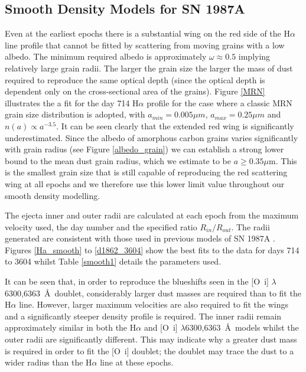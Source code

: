 \documentclass[useAMS,usenatbib,usegraphicx]{mnras}
\begin{document}
\subsection{Smooth Density Models for SN 1987A}
\label{smooth_models}

Even at the earliest epochs there is a substantial wing on the red side of 
the H$\alpha$ line profile that cannot be fitted by scattering from moving grains with a low albedo.  The 
minimum required albedo is approximately $\omega \approx 0.5$ implying relatively large grain radii.  The larger 
the grain size the larger the mass of dust required to reproduce the same 
optical depth (since the optical depth is dependent only on the 
cross-sectional area of the grains).  Figure \ref{MRN} illustrates the 
a fit for the day 714 H$\alpha$ profile for the case where a classic MRN \citep{Mathis1977} grain size 
distribution is adopted, with $a_{min}=0.005 \mu m$, $a_{max}=0.25 \mu m$ 
and $n(a) \propto a^{-3.5}$.  It can be seen clearly that the extended red wing is 
significantly underestimated.  Since the albedo of  
amorphous carbon grains varies significantly with grain radius (see Figure \ref{albedo_grain}) we can establish a strong 
lower bound to the mean dust grain radius, which we estimate to be $a \ge 0.35\mu$m.  This is the smallest grain size that is still 
capable of reproducing the red scattering wing at all epochs and we 
therefore use this lower limit value throughout our smooth density modelling.

The ejecta inner and outer radii are calculated at each epoch from the maximum 
velocity used, the day number and the specified ratio $R_{in}/R_{out}$.  
The radii generated are consistent with those used in previous models of 
SN 1987A \citep{Ercolano2007, Wesson2015}.  Figures \ref{Ha_smooth} to 
\ref{d1862_3604} show the best fits to the data for days 714 to 3604 whilst 
Table \ref{smooth1} details the parameters used.

It can be seen that, in order to reproduce the blueshifts seen in the 
[O~{\sc i}] $\lambda$6300,6363~\AA\ doublet, considerably larger dust masses 
are required than to fit the H$\alpha$ line.  However, larger maximum 
velocities are also required to fit the wings and a significantly steeper 
density profile is required.  The inner radii remain approximately similar 
in both the H$\alpha$ and [O~{\sc i}] $\lambda$6300,6363~\AA\ models whilst the 
outer radii are significantly different.  This may indicate why a greater 
dust mass is required in order to fit the [O~{\sc i}] doublet; the doublet may
trace the dust to a wider radius than the H$\alpha$ line at these epochs.
\end{document}
